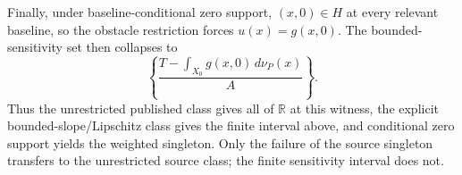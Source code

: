 Finally, under baseline-conditional zero support, \((x,0)\in H\) at every relevant baseline, so the obstacle restriction forces \(u(x)=g(x,0)\).  The bounded-sensitivity set then collapses to
\[
 \left\{\frac{T-\int_{X_0}g(x,0)\,d\nu_P(x)}{A}\right\}.
\]
Thus the unrestricted published class gives all of \(\mathbb R\) at this witness, the explicit bounded-slope/Lipschitz class gives the finite interval above, and conditional zero support yields the weighted singleton.  Only the failure of the source singleton transfers to the unrestricted source class; the finite sensitivity interval does not.
